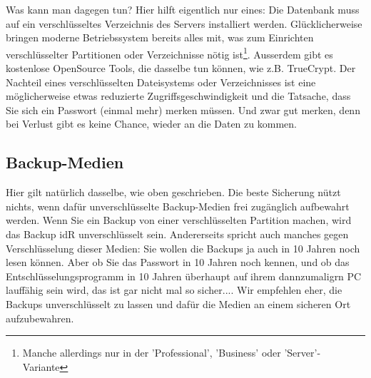 \medskip

Was kann man dagegen tun?
Hier hilft eigentlich nur eines: Die Datenbank muss auf ein verschlüsseltes Verzeichnis des Servers installiert werden. Glücklicherweise bringen moderne Betriebssystem bereits alles mit, was zum Einrichten verschlüsselter Partitionen oder Verzeichnisse nötig ist\footnote{Manche allerdings nur in der 'Professional', 'Business' oder 'Server'-Variante}. Ausserdem gibt es kostenlose OpenSource Tools, die dasselbe tun können, wie z.B. TrueCrypt. 
Der Nachteil eines verschlüsselten Dateisystems oder Verzeichnisses ist eine möglicherweise etwas reduzierte Zugriffsgeschwindigkeit und die Tatsache, dass Sie sich ein Passwort (einmal mehr) merken müssen. Und zwar gut merken, denn bei Verlust gibt es keine Chance, wieder an die Daten zu kommen.

\subsection{Backup-Medien}
Hier gilt natürlich dasselbe, wie oben geschrieben. Die beste Sicherung nützt nichts, wenn dafür unverschlüsselte Backup-Medien frei zugänglich aufbewahrt werden. Wenn Sie ein Backup von einer verschlüsselten Partition machen, wird das Backup idR unverschlüsselt sein. Andererseits spricht auch manches gegen Verschlüsselung dieser Medien: Sie wollen die Backups ja auch in 10 Jahren noch lesen können. Aber ob Sie das Passwort in 10 Jahren noch kennen, und ob das Entschlüsselungsprogramm in 10 Jahren überhaupt auf ihrem dannzumaligrn PC lauffähig sein wird, das ist gar nicht mal so sicher....
Wir empfehlen eher, die Backups unverschlüsselt zu lassen und dafür die Medien an einem sicheren Ort aufzubewahren. 
